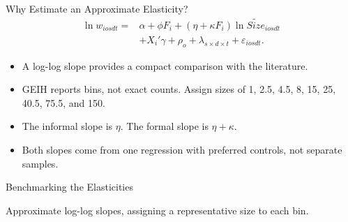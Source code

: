 \begin{frame}{Why Estimate an Approximate Elasticity?}
  \small
  \[
  \begin{aligned}
  \ln w_{iosdt}={}&\alpha+\phi F_i+(\eta+\kappa F_i)\ln\widetilde{Size}_{iosdt}\\
       &+X_i'\gamma+\rho_o+\lambda_{s\times d\times t}+\varepsilon_{iosdt}.
  \end{aligned}
  \]
  \begin{itemize}
    \item A log-log slope provides a compact comparison with the literature.
    \item GEIH reports bins, not exact counts. Assign sizes of 1, 2.5, 4.5, 8, 15, 25, 40.5, 75.5, and 150.
    \item The informal slope is $\eta$. The formal slope is $\eta+\kappa$.
    \item Both slopes come from one regression with preferred controls, not separate samples.
  \end{itemize}
\end{frame}

\begin{frame}{Benchmarking the Elasticities}
  \centering\small
  {Approximate log-log slopes, assigning a representative size to each bin.\par}\vspace{0.2cm}
  \setlength{\tabcolsep}{4pt}
  
  \par\vspace{0.2cm}
\end{frame}


